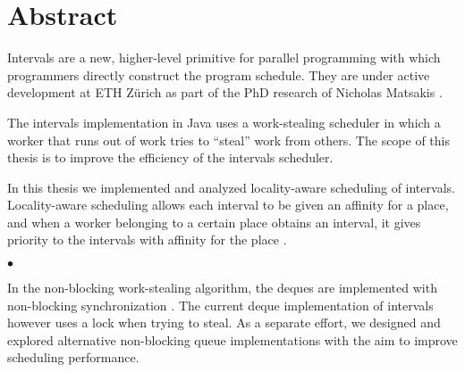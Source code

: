 
\chapter*{Abstract}
\label{chap:abstract}

Intervals \cite{Matsakis2009a} are a new, higher-level primitive for
parallel programming with which programmers directly construct the
program schedule. They are under active development at ETH Zürich as
part of the PhD research of Nicholas Matsakis \cite{Matsakis2010}.

The intervals implementation in Java uses a work-stealing scheduler in
which a worker that runs out of work tries to ``steal'' work from
others. The scope of this thesis is to improve the efficiency of the
intervals scheduler.

In this thesis we implemented and analyzed locality-aware scheduling of
intervals. Locality-aware scheduling allows each interval to be given
an affinity for a place, and when a worker belonging to a certain
place obtains an interval, it gives priority to the intervals with
affinity for the place \cite{Acar2002, Guo2010}.

\begin{center}
  $\bullet$
\end{center}

In the non-blocking work-stealing algorithm, the deques are
implemented with non-blocking synchronization \cite{Arora2001}. The
current deque implementation of intervals however uses a lock when
trying to steal. As a separate effort, we designed and explored
alternative non-blocking queue implementations with the aim to improve
scheduling performance.




